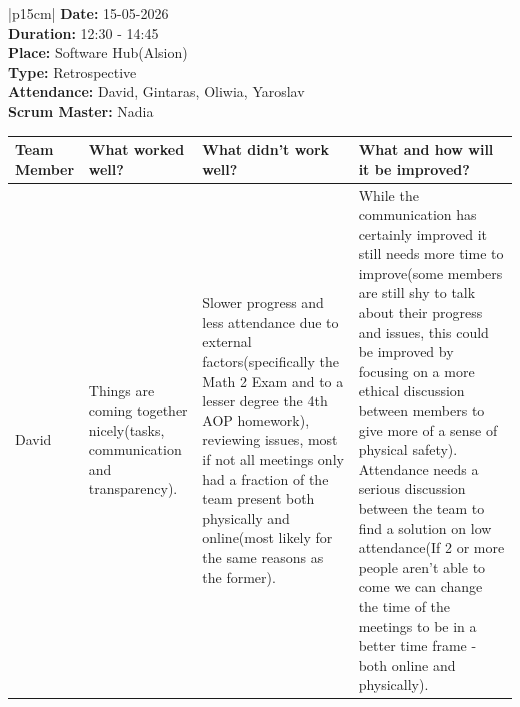 \begin{table}[H]
    \centering
    \begin{tabular}{|p{15cm}|}   
        \hline
        \textbf{Date:}  15-05-2026 \\
        \textbf{Duration:} 12:30 - 14:45 \\
        \textbf{Place:}  Software Hub(Alsion) \\
        \textbf{Type:} Retrospective \\
        \textbf{Attendance:} David, Gintaras, Oliwia, Yaroslav \\
        \textbf{Scrum Master:} Nadia 
        \begin{table}[H]
            \begin{tabular}{|p{1.75cm}|p{4cm}|p{4cm}|p{4cm}|}
                \hline
                \cellcolor[HTML]{BFBFBF}  \textbf{Team Member} & \cellcolor[HTML]{BFBFBF} \textbf{What worked well?} & \cellcolor[HTML]{BFBFBF}  \textbf{What didn’t work well?} & \cellcolor[HTML]{BFBFBF}  \textbf{What and how will it be improved?}\\
                \hline
                \cellcolor[HTML]{d4d4d4} David & Things are coming together nicely(tasks, communication and transparency). & Slower progress and less attendance due to external factors(specifically the Math 2 Exam and to a lesser degree the 4th AOP homework), reviewing issues, most if not all meetings only had a fraction of the team present both physically and online(most likely for the same reasons as the former).  & While the communication has certainly improved it still needs more time to improve(some members are still shy to talk about their progress and issues, this could be improved by focusing on a more ethical discussion between members to give more of a sense of physical safety). Attendance needs a serious discussion between the team to find a solution on low attendance(If 2 or more people aren't able to come we can change the time of the meetings to be in a better time frame - both online and physically). \\
                \hline
                
            \end{tabular}
        \end{table}\\
        \hline
    \end{tabular}
\end{table}

